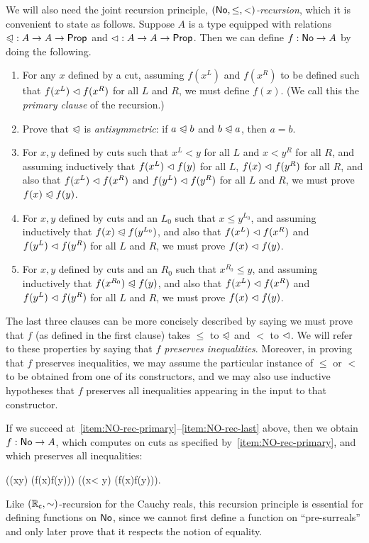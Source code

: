 We will also need the joint recursion principle, \emph{$(\mathsf{No},\le,<)$-recursion}, which it is convenient to state as follows.
Suppose $A$ is a type equipped with relations $\mathord{\trianglelefteqslant}:A\to A\to\mathsf{Prop}$ and $\mathord{\vartriangleleft}:A\to A\to\mathsf{Prop}$.
Then we can define $f:\mathsf{No}\to A$ by doing the following.
\begin{enumerate}
\item For any $x$ defined by a cut, assuming $f(x^L)$ and $f(x^R)$ to be defined such that $f(x^L)\vartriangleleft f(x^R)$ for all $L$ and $R$, we must define $f(x)$.  (We call this the \emph{primary clause} of the recursion.)\label{item:NO-rec-primary}
\item Prove that $\trianglelefteqslant$ is \emph{antisymmetric}: if $a\trianglelefteqslant b$ and $b\trianglelefteqslant a$, then $a=b$.
\item For $x,y$ defined by cuts such that $x^L<y$ for all $L$ and $x<y^R$ for all $R$, and assuming inductively that $f(x^L)\vartriangleleft f(y)$ for all $L$, $f(x)\vartriangleleft f(y^R)$ for all $R$, and also that $f(x^L)\vartriangleleft f(x^R)$ and $f(y^L)\vartriangleleft f(y^R)$ for all $L$ and $R$, we must prove $f(x)\trianglelefteqslant f(y)$.
\item For $x,y$ defined by cuts and an $L_0$ such that $x\le y^{L_0}$, and assuming inductively that $f(x)\trianglelefteqslant f(y^{L_0})$, and also that $f(x^L)\vartriangleleft f(x^R)$ and $f(y^L)\vartriangleleft f(y^R)$ for all $L$ and $R$, we must prove $f(x)\vartriangleleft f(y)$.
\item For $x,y$ defined by cuts and an $R_0$ such that $x^{R_0}\le y$, and assuming inductively that $f(x^{R_0})\trianglelefteqslant f(y)$, and also that $f(x^L)\vartriangleleft f(x^R)$ and $f(y^L)\vartriangleleft f(y^R)$ for all $L$ and $R$, we must prove $f(x)\vartriangleleft f(y)$.\label{item:NO-rec-last}
\end{enumerate}
The last three clauses can be more concisely described by saying we must prove that $f$ (as defined in the first clause) takes $\le$ to $\trianglelefteqslant$ and $<$ to $\vartriangleleft$.
We will refer to these properties by saying that \emph{$f$ preserves inequalities}.
Moreover, in proving that $f$ preserves inequalities, we may assume the particular instance of $\le$ or $<$ to be obtained from one of its constructors, and we may also use inductive hypotheses that $f$ preserves all inequalities appearing in the input to that constructor.

If we succeed at~\ref{item:NO-rec-primary}--\ref{item:NO-rec-last} above, then we obtain $f:\mathsf{No}\to A$, which computes on cuts as specified by~\ref{item:NO-rec-primary}, and which preserves all inequalities:
%
\begin{narrowmultline*}
  \Big((x\le y) \to (f(x)\ble f(y))\Big) \land
  \narrowbreak
  \Big((x< y) \to (f(x)\blt f(y))\Big).  
\end{narrowmultline*}
%
Like $(\mathbb{R}_\mathsf{c},\mathord\sim)$-recursion for the Cauchy reals, this recursion principle is essential for defining functions on $\mathsf{No}$, since we cannot first define a function on ``pre-surreals'' and only later prove that it respects the notion of equality.

